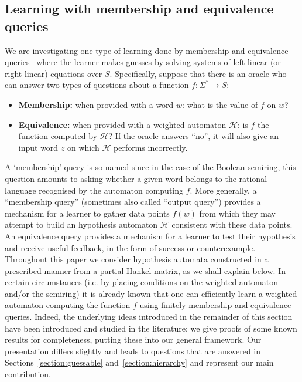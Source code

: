 \documentclass[10pt,a4paper]{amsart}
\theoremstyle{definition}
\numberwithin{equation}{section}
\numberwithin{theorem}{section}
\begin{document}
\subsection{Learning with membership and equivalence queries}

We are investigating one type of learning done by membership and equivalence queries~\cite{A87,BV96,BM15} where the learner makes guesses by solving systems of left-linear (or right-linear) equations over $S$. Specifically, suppose that there is an oracle who can answer two types of questions about a function $f: \Sigma^* \rightarrow S$:
\begin{itemize}
	\item \textbf{Membership:} when provided with a word $w$: what is the value of $f$ on $w$? 
	\item \textbf{Equivalence:} when provided with a weighted automaton $\mathcal{H}$: is $f$ the function computed by $\mathcal{H}$? If the oracle answers ``no'', it will also give an input word $z$ on which $\mathcal{H}$ performs incorrectly.
\end{itemize}
A `membership' query is so-named since in the case of the Boolean semiring, this question amounts to asking whether a given word belongs to the rational language recognised by the automaton computing $f$. More generally, a ``membership query'' (sometimes also called ``output query'') provides a mechanism for a learner to gather data points $f(w)$ from which they may attempt to build an hypothesis automaton $\mathcal{H}$ consistent with these data points. An equivalence query provides a mechanism for a learner to test their hypothesis and receive useful feedback, in the form of success or counterexample. Throughout this paper we consider hypothesis automata constructed in a prescribed manner from a partial Hankel matrix, as we shall explain below.  In certain circumstances (i.e. by placing conditions on the weighted automaton and/or the semiring) it is already known that one can efficiently learn a weighted automaton computing the function $f$ using finitely membership and equivalence queries. Indeed, the underlying ideas introduced in the remainder of this section have been introduced and studied in the literature;  we give proofs of some known results for completeness, putting these into our general framework. Our presentation differs slightly and leads to questions that are answered in Sections~\ref{section:guessable} and~\ref{section:hierarchy} and represent our main contribution.
\end{document}
